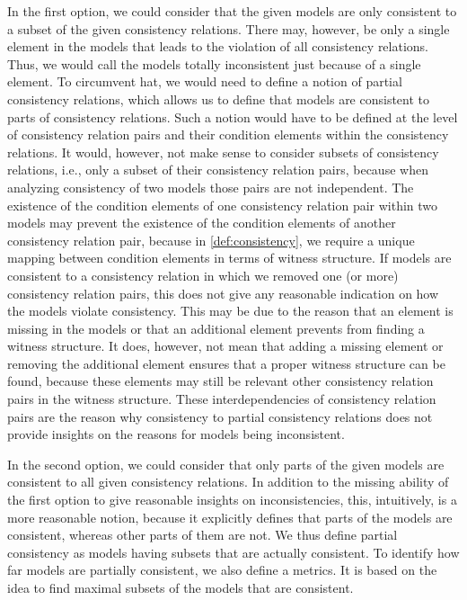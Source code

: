 In the first option, we could consider that the given models are only consistent to a subset of the given consistency relations.
There may, however, be only a single element in the models that leads to the violation of all consistency relations.
Thus, we would call the models totally inconsistent just because of a single element.
To circumvent hat, we would need to define a notion of partial consistency relations, which allows us to define that models are consistent to parts of consistency relations.
Such a notion would have to be defined at the level of consistency relation pairs and their condition elements within the consistency relations.
It would, however, not make sense to consider subsets of consistency relations, i.e., only a subset of their consistency relation pairs, because when analyzing consistency of two models those pairs are not independent.
The existence of the condition elements of one consistency relation pair within two models may prevent the existence of the condition elements of another consistency relation pair, because in \autoref{def:consistency}, we require a unique mapping between condition elements in terms of witness structure.
If models are consistent to a consistency relation in which we removed one (or more) consistency relation pairs, this does not give any reasonable indication on how the models violate consistency.
This may be due to the reason that an element is missing in the models or that an additional element prevents from finding a witness structure.
It does, however, not mean that adding a missing element or removing the additional element ensures that a proper witness structure can be found, because these elements may still be relevant other consistency relation pairs in the witness structure.
These interdependencies of consistency relation pairs are the reason why consistency to partial consistency relations does not provide insights on the reasons for models being inconsistent.

In the second option, we could consider that only parts of the given models are consistent to all given consistency relations.
In addition to the missing ability of the first option to give reasonable insights on inconsistencies, this, intuitively, is a more reasonable notion, because it explicitly defines that parts of the models are consistent, whereas other parts of them are not.
We thus define partial consistency as models having subsets that are actually consistent.
To identify how far models are partially consistent, we also define a metrics.
It is based on the idea to find maximal subsets of the models that are consistent.

